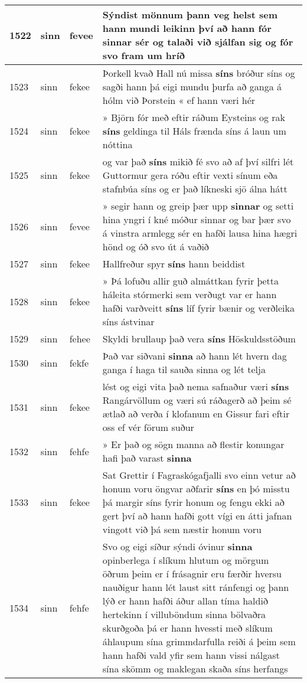 \documentclass{article}
\begin{document}
\begin{longtable}{p{1cm}|p{1cm}|p{1cm}|p{13cm}}
\hline
1522&sinn&fevee&Sýndist mönnum þann veg helst sem hann mundi leikinn því að hann fór \textbf{sinnar} sér og talaði við sjálfan sig og fór svo fram um hríð\\
\hline
1523&sinn&fekee&Þorkell kvað Hall nú missa \textbf{síns} bróður síns og sagði hann þá eigi mundu þurfa að ganga á hólm við Þorstein « ef hann væri hér\\
\hline
1524&sinn&fekee&» Björn fór með eftir ráðum Eysteins og rak \textbf{síns} geldinga til Háls frænda síns á laun um nóttina\\
\hline
1525&sinn&fekee&og var það \textbf{síns} mikið fé svo að af því silfri lét Guttormur gera róðu eftir vexti sínum eða stafnbúa síns og er það líkneski sjö álna hátt\\
\hline
1526&sinn&fevee&» segir hann og greip þær upp \textbf{sinnar} og setti hina yngri í kné móður sinnar og bar þær svo á vinstra armlegg sér en hafði lausa hina hægri hönd og óð svo út á vaðið\\
\hline
1527&sinn&fekee&Hallfreður spyr \textbf{síns} hann beiddist\\
\hline
1528&sinn&fekee&» Þá lofuðu allir guð almáttkan fyrir þetta háleita stórmerki sem verðugt var er hann hafði varðveitt \textbf{síns} líf fyrir bænir og verðleika síns ástvinar\\
\hline
1529&sinn&fehee&Skyldi brullaup það vera \textbf{síns} Höskuldsstöðum\\
\hline
1530&sinn&fekfe&Það var siðvani \textbf{sinna} að hann lét hvern dag ganga í haga til sauða sinna og lét telja\\
\hline
1531&sinn&fekee&lést og eigi vita það nema safnaður væri \textbf{síns} Rangárvöllum og væri sú ráðagerð að þeim sé ætlað að verða í klofanum en Gissur fari eftir oss ef vér förum suður\\
\hline
1532&sinn&fehfe&» Er það og sögn manna að flestir konungar hafi það varast \textbf{sinna} \\
\hline
1533&sinn&fekee&Sat Grettir í Fagraskógafjalli svo einn vetur að honum voru öngvar aðfarir \textbf{síns} en þó misstu þá margir síns fyrir honum og fengu ekki að gert því að hann hafði gott vígi en átti jafnan vingott við þá sem næstir honum voru\\
\hline
1534&sinn&fehfe&Svo og eigi síður sýndi óvinur \textbf{sinna} opinberlega í slíkum hlutum og mörgum öðrum þeim er í frásagnir eru færðir hversu nauðigur hann lét laust sitt ránfengi og þann lýð er hann hafði áður allan tíma haldið hertekinn í villuböndum sinna bölvaðra skurðgoða þá er hann hvessti með slíkum áhlaupum sína grimmdarfulla reiði á þeim sem hann hafði vald yfir sem hann vissi nálgast sína skömm og maklegan skaða síns herfangs\\

\end{longtable}
\end{document}
